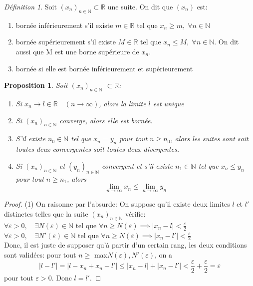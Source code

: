 \documentclass[oneside,12pt,french,table]{book}
\theoremstyle{definition}
\theoremstyle{plain}
\newtheorem{proposition}[definition]{Proposition}
\theoremstyle{remark}
\newtheorem{defi}[definition]{Définition}
\newcommand{\Nn}{{\mathbb{N}}}
\newcommand{\Rr}{{\mathbb{R}}}
\begin{document}
\begin{defi}
    Soit $(x_n)_{n\in\Nn}\subset \Rr$ une suite. On dit que $(x_n)$ est:
    \begin{enumerate}
        \item bornée inférieurement s'il existe $m\in \Rr$ tel que $x_n\geq m,\; \forall n\in\Nn$
        \item bornée supérieurement s'il existe $M\in\Rr$ tel que $x_n\leq M,\; \forall n \in\Nn$. On dit aussi que M est une borne supérieure de $x_n$.
        \item bornée si elle est bornée inférieurement et supérieurement
    \end{enumerate}
\end{defi}
\begin{proposition}Soit $(x_n)_{n\in\Nn}$ $\subset \Rr$:
\begin{enumerate}
  \item Si $x_n\longrightarrow l\in \Rr \quad(n\rightarrow\infty)$, alors la limite $l$ est unique
  \item Si $(x_n)_{n\in\Nn}$ converge, alors elle est bornée.
  \item S'il existe $n_0\in\Nn$ tel que $x_n=y_n$ pour tout $n\geq n_0$, alors les suites sont soit toutes deux convergentes soit toutes deux divergentes.
  \item Si $(x_n)_{n\in\Nn}$ et $(y_n)_{n\in\Nn}$ convergent et s'il existe $n_1\in \Nn$ tel que $x_n\leq y_n$ pour tout $n\geq n_1$, alors \[\lim_{n\rightarrow\infty}x_n\leq\lim_{n\rightarrow\infty}y_n\]
\end{enumerate}
\end{proposition}
\begin{proof}
(1) On raisonne par l'absurde:
On suppose qu'il existe deux limites $l$ et $l'$ distinctes telles que la suite $(x_n)_{n\in\Nn}$ vérifie: 
\\$\forall \varepsilon>0 ,\quad \exists N(\varepsilon)\in\Nn$ tel que $ \forall n \geq N(\varepsilon) \implies |x_n-l|<\frac{\varepsilon}{2}$
\\$\forall \varepsilon>0 ,\quad \exists N'(\varepsilon)\in\Nn$ tel que $ \forall n \geq N(\varepsilon) \implies |x_n-l'|<\frac{\varepsilon}{2}$
\\Donc, il est juste de supposer qu'à partir d'un certain rang, les deux conditions sont validées: pour tout $n\geq$ max{$N(\varepsilon), N'(\varepsilon)$}, on a
\begin{equation*}
    |l-l'|=|l-x_n+x_n-l'|\leq |x_n-l|+|x_n-l'|<\frac{\varepsilon}{2}+\frac{\varepsilon}{2}=\varepsilon
\end{equation*}
pour tout $\varepsilon>0$.
Donc $l=l'$.
\end{proof}
\end{document}
